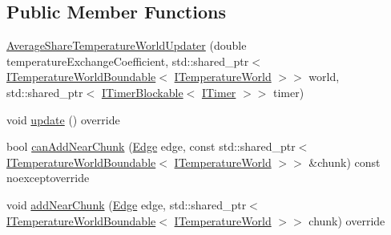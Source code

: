 \subsection*{Public Member Functions}
\begin{DoxyCompactItemize}
\item 
\hyperlink{class_average_share_temperature_world_updater_a0031a5c20f9b717f0eb099f1d69e5ced}{Average\-Share\-Temperature\-World\-Updater} (double temperature\-Exchange\-Coefficient, std\-::shared\-\_\-ptr$<$ \hyperlink{class_i_temperature_world_boundable}{I\-Temperature\-World\-Boundable}$<$ \hyperlink{class_i_temperature_world}{I\-Temperature\-World} $>$$>$ world, std\-::shared\-\_\-ptr$<$ \hyperlink{class_i_timer_blockable}{I\-Timer\-Blockable}$<$ \hyperlink{class_i_timer}{I\-Timer} $>$$>$ timer)
\item 
void \hyperlink{class_average_share_temperature_world_updater_a29be9be2073572f3ef2dc5315c506245}{update} () override
\item 
bool \hyperlink{class_average_share_temperature_world_updater_a2b3403ad5d9c7ef2f39b359fc87f44b8}{can\-Add\-Near\-Chunk} (\hyperlink{_edge_8hpp_a5be7c8fa582f7b873d1c6caacb633073}{Edge} edge, const std\-::shared\-\_\-ptr$<$ \hyperlink{class_i_temperature_world_boundable}{I\-Temperature\-World\-Boundable}$<$ \hyperlink{class_i_temperature_world}{I\-Temperature\-World} $>$$>$ \&chunk) const noexceptoverride
\item 
void \hyperlink{class_average_share_temperature_world_updater_ab48c277317950d9b9e571d13f3461307}{add\-Near\-Chunk} (\hyperlink{_edge_8hpp_a5be7c8fa582f7b873d1c6caacb633073}{Edge} edge, std\-::shared\-\_\-ptr$<$ \hyperlink{class_i_temperature_world_boundable}{I\-Temperature\-World\-Boundable}$<$ \hyperlink{class_i_temperature_world}{I\-Temperature\-World} $>$$>$ chunk) override
\end{DoxyCompactItemize}
